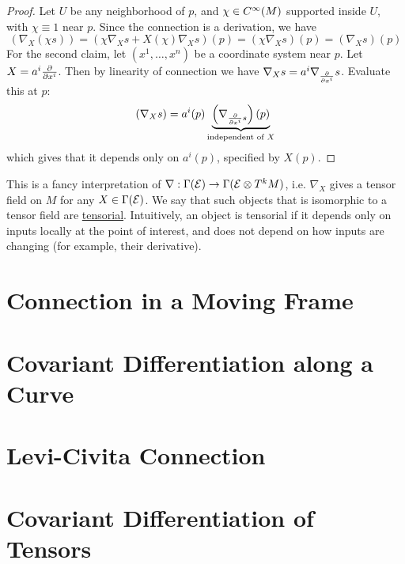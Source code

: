 \documentclass{article}
\begin{document}
\begin{proof}
    Let $U$ be any neighborhood of $p$, and $\chi \in C^{\infty}(M)$ supported inside $U$, with $\chi \equiv 1$ near $p$. Since the connection is a derivation, we have
    \[
        \left( \nabla_X (\chi s) \right) = \left( \chi \nabla_X s + {X(\chi)} \nabla_X s \right) (p) = \left( \chi \nabla_X s \right) (p) = (\nabla_X s)(p)
    \]
    For the second claim, let $(x^1, \dots, x^n)$ be a coordinate system near $p$. Let $X = a^i \frac{\partial}{\partial x^i}$. Then by linearity of connection we have $\nabla_X s = a^i \nabla_{\frac{\partial}{\partial x^i}} s$. Evaluate this at $p$:
    \[
        (\nabla_X s) = a^i(p) \underbrace{\left( \nabla_{\frac{\partial}{\partial x^i} s} \right) (p)}_{\text{independent of $X$}}
    \]
    which gives that it depends only on $a^i(p)$, specified by $X(p)$.
\end{proof}

\begin{remark}
    This is a fancy interpretation of $\nabla: \Gamma(\mathcal{E}) \to \Gamma(\mathcal{E} \otimes T^k M)$, i.e. $\nabla_X$ gives a tensor field on $M$ for any $X \in \Gamma(\mathcal{E})$. We say that such objects that is isomorphic to a tensor field are \underline{tensorial}. Intuitively, an object is tensorial if it depends only on inputs locally at the point of interest, and does not depend on how inputs are changing (for example, their derivative).
\end{remark}

\section{Connection in a Moving Frame}

\section{Covariant Differentiation along a Curve}

\section{Levi-Civita Connection}

\section{Covariant Differentiation of Tensors}
\end{document}
